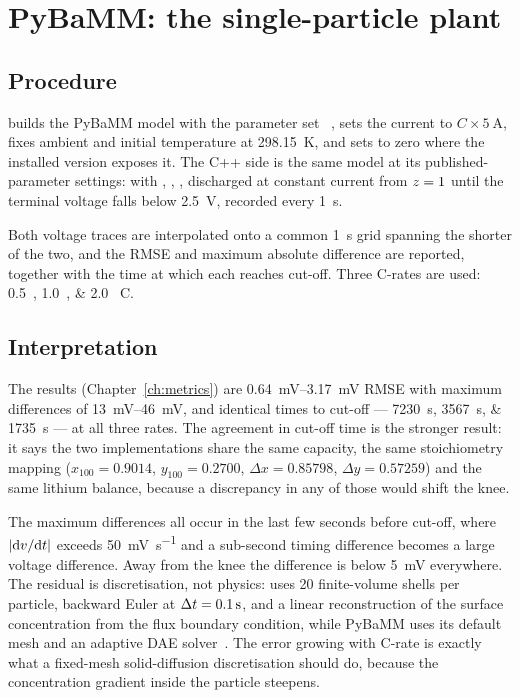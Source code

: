 \section{PyBaMM: the single-particle plant}

\subsection{Procedure}

 builds the PyBaMM model  with the
parameter set ~\cite{chen2020parameterization}, sets the current to
$C\times\SI{5}{\ampere}$, fixes ambient and initial temperature at \SI{298.15}{\kelvin}, and sets
 to zero where the installed version exposes it. The C++ side is the
same model at its published-parameter settings:  with
, , , discharged at
constant current from $z=1$ until the terminal voltage falls below \SI{2.5}{\volt}, recorded
every \SI{1}{\second}.

Both voltage traces are interpolated onto a common \SI{1}{\second} grid spanning the shorter of the
two, and the RMSE and maximum absolute difference are reported, together with the time at which each
reaches cut-off. Three C-rates are used: \SIlist{0.5;1.0;2.0}{} C.

\subsection{Interpretation}

The results (Chapter~\ref{ch:metrics}) are \SIrange{0.64}{3.17}{\milli\volt} RMSE with maximum
differences of \SIrange{13}{46}{\milli\volt}, and identical times to cut-off --- \SIlist{7230;3567;1735}{\second}
--- at all three rates. The agreement in cut-off time is the stronger result: it says the two
implementations share the same capacity, the same stoichiometry mapping
($x_{100}=0.9014$, $y_{100}=0.2700$, $\Delta x = 0.85798$, $\Delta y = 0.57259$) and the same
lithium balance, because a discrepancy in any of those would shift the knee.

The maximum differences all occur in the last few seconds before cut-off, where
$\left\lvert \mathrm{d}v/\mathrm{d}t \right\rvert$ exceeds \SI{50}{\milli\volt\per\second} and a sub-second timing
difference becomes a large voltage difference. Away from the knee the difference is below
\SI{5}{\milli\volt} everywhere. The residual is discretisation, not physics:  uses 20
finite-volume shells per particle, backward Euler at $\Delta t=\SI{0.1}{\second}$, and a linear
reconstruction of the surface concentration from the flux boundary condition, while PyBaMM uses its
default mesh and an adaptive DAE solver~\cite{andersson2019casadi}. The error growing with C-rate is
exactly what a fixed-mesh solid-diffusion discretisation should do, because the concentration
gradient inside the particle steepens.

